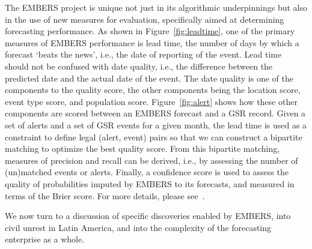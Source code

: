 The EMBERS project is unique not just in its algorithmic underpinnings but also in the use of new measures
for evaluation, specifically aimed at determining forecasting performance. As
shown in Figure~\ref{fig:leadtime},
one of the primary measures of EMBERS performance is lead time, the number of days by which a forecast
`beats the news', i.e., the date of reporting of the event. Lead time should not be confused with
date quality, i.e., the difference between the predicted date and the actual date of the event. The date
quality is one of the components to the quality score, the other components being the
location score, event type score, and population score.
Figure~\ref{fig:alert} 
shows how these other
components are scored between an EMBERS forecast and a GSR record. Given a set of alerts and a set of
GSR events for a given month, the lead time is used as a constraint to define legal (alert, event) pairs so that
we can construct a bipartite matching to optimize the best quality score. From this bipartite matching,
measures of precision and recall can be derived, i.e., by assessing the number of (un)matched events or
alerts. Finally, a confidence score is used to assess the quality of probabilities imputed by EMBERS to its
forecasts, and measured in terms of the Brier score. For more details, please
see~\cite{kdd:beating-the-news}.

We now turn to a discussion of specific discoveries enabled by EMBERS, into civil unrest in Latin America, and into
the complexity of the forecasting enterprise as a whole.

